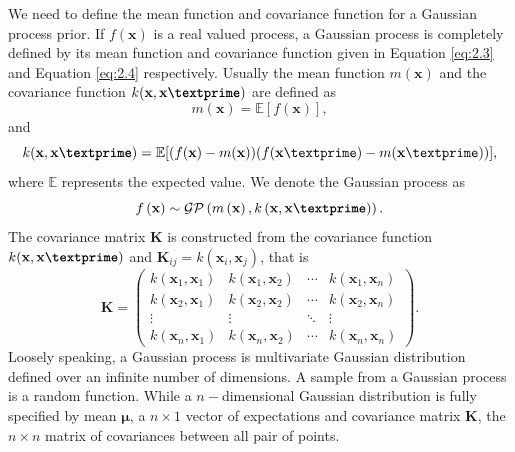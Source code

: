 We need to define the mean function and covariance function for a Gaussian process prior. If $f(\textbf{x})$ is a real valued process, a Gaussian process is completely defined by its mean function and covariance function given in Equation \ref{eq:2.3} and Equation \ref{eq:2.4} respectively. Usually the mean function $m(\textbf{x})$  and the covariance function $k(\textbf{x},\textbf{x\textprime})$ are defined as
\begin{equation} \label{eq:2.3}
m(\textbf{x})= \mathbb{E}[f(\textbf{x})],
\end{equation}
and
\begin{equation} \label{eq:2.4}
k(\textbf{x},\textbf{x\textprime})= 
\mathbb{E}[(f(\textbf{x})-m(\textbf{x}))(f(\textbf{x}\textprime)-m(\textbf{x}\textprime))],
\end{equation}
where $\mathbb{E}$ represents the expected value. We denote the Gaussian process as
\begin{equation} \label{eq:GP}
f\left(\textbf{x} \right)\sim \mathcal{GP} \left(m \left(\textbf{x}\right), k \left(\textbf{x},\textbf{x\textprime}\right) \right).
\end{equation}
The covariance matrix $\textbf{K}$ is constructed from the covariance function $k(\textbf{x},\textbf{x\textprime})$ and $\textbf{K}_{ij}=k\left(\textbf{x}_i,\textbf{x}_j\right)$, that is 
\begin{equation} \label{eq:GP_cov_mat}
\textbf{K} = 
\begin{pmatrix}
k\left(\textbf{x}_1,\textbf{x}_1\right) & k\left(\textbf{x}_1,\textbf{x}_2\right) & \cdots & k\left(\textbf{x}_1,\textbf{x}_n\right) \\
k\left(\textbf{x}_2,\textbf{x}_1\right) & k\left(\textbf{x}_2,\textbf{x}_2\right) & \cdots & k\left(\textbf{x}_2,\textbf{x}_n\right) \\
\vdots  & \vdots  & \ddots & \vdots  \\
k\left(\textbf{x}_n,\textbf{x}_1\right) & k\left(\textbf{x}_n,\textbf{x}_2\right) & \cdots & k\left(\textbf{x}_n,\textbf{x}_n\right)
\end{pmatrix}.
\end{equation}
Loosely speaking, a Gaussian process is multivariate Gaussian distribution defined over an infinite number of dimensions. A sample from a Gaussian process is a random function. While a $n-$dimensional Gaussian distribution is fully specified by mean $\boldsymbol\mu$, a $n \times 1$ vector of expectations and covariance matrix $\textbf{K}$, the $n \times n$ matrix of covariances between all pair of points.

